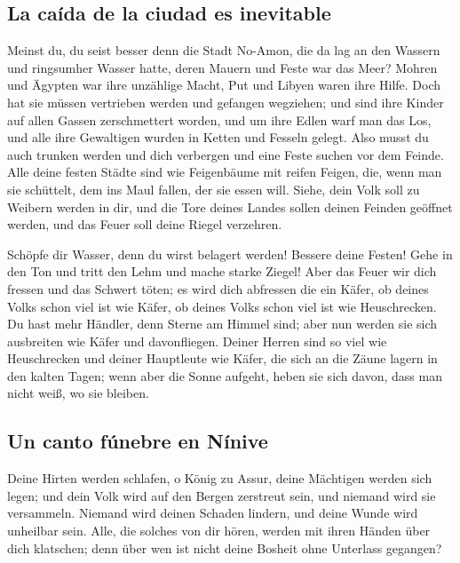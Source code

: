 \hypertarget{la-cauxedda-de-la-ciudad-es-inevitable}{%
\subsection{La caída de la ciudad es
inevitable}\label{la-cauxedda-de-la-ciudad-es-inevitable}}

 Meinst du, du seist besser denn die Stadt No-Amon, die da
lag an den Wassern und ringsumher Wasser hatte, deren Mauern und Feste
war das Meer?  Mohren und Ägypten war ihre unzählige
Macht, Put und Libyen waren ihre Hilfe.  Doch hat sie
müssen vertrieben werden und gefangen wegziehen; und sind ihre Kinder
auf allen Gassen zerschmettert worden, und um ihre Edlen warf man das
Los, und alle ihre Gewaltigen wurden in Ketten und Fesseln gelegt.
 Also musst du auch trunken werden und dich verbergen und
eine Feste suchen vor dem Feinde.  Alle deine festen
Städte sind wie Feigenbäume mit reifen Feigen, die, wenn man sie
schüttelt, dem ins Maul fallen, der sie essen will. 
Siehe, dein Volk soll zu Weibern werden in dir, und die Tore deines
Landes sollen deinen Feinden geöffnet werden, und das Feuer soll deine
Riegel verzehren.

 Schöpfe dir Wasser, denn du wirst belagert werden!
Bessere deine Festen! Gehe in den Ton und tritt den Lehm und mache
starke Ziegel!  Aber das Feuer wir dich fressen und das
Schwert töten; es wird dich abfressen die ein Käfer, ob deines Volks
schon viel ist wie Käfer, ob deines Volks schon viel ist wie
Heuschrecken.  Du hast mehr Händler, denn Sterne am
Himmel sind; aber nun werden sie sich ausbreiten wie Käfer und
davonfliegen.  Deiner Herren sind so viel wie
Heuschrecken und deiner Hauptleute wie Käfer, die sich an die Zäune
lagern in den kalten Tagen; wenn aber die Sonne aufgeht, heben sie sich
davon, dass man nicht weiß, wo sie bleiben.

\hypertarget{un-canto-fuxfanebre-en-nuxednive}{%
\subsection{Un canto fúnebre en
Nínive}\label{un-canto-fuxfanebre-en-nuxednive}}

 Deine Hirten werden schlafen, o König zu Assur, deine
Mächtigen werden sich legen; und dein Volk wird auf den Bergen zerstreut
sein, und niemand wird sie versammeln.  Niemand wird
deinen Schaden lindern, und deine Wunde wird unheilbar sein. Alle, die
solches von dir hören, werden mit ihren Händen über dich klatschen; denn
über wen ist nicht deine Bosheit ohne Unterlass gegangen?
